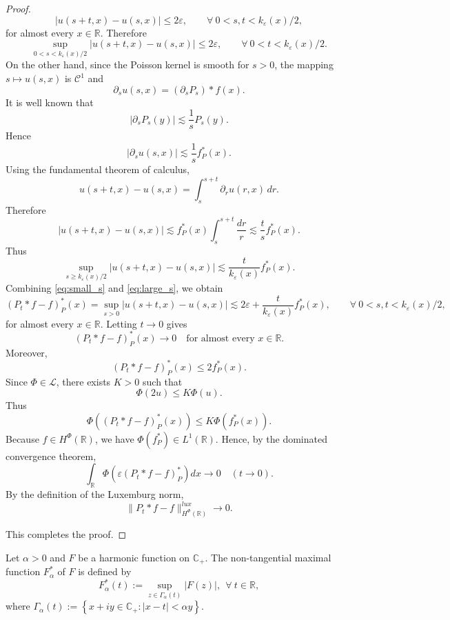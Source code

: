 \documentclass[a4paper,12pt,intlimits,oneside]{amsart}
\theoremstyle{definition}
\numberwithin{equation}{section}
\theoremstyle{definition}
\begin{document}
\begin{proof}
\[
|u(s+t,x)-u(s,x)|
\le
2\varepsilon,
\qquad \forall~ 0<s,t<k_{\varepsilon}(x)/2,
\]
for almost every $x\in\mathbb R$. Therefore
\begin{equation}\label{eq:small_s}
\sup_{0<s<k_\varepsilon(x)/2}
|u(s+t,x)-u(s,x)|
\le
2\varepsilon,
\qquad \forall~ 0<t<k_\varepsilon(x)/2 .
\end{equation}
On the other hand, since the Poisson kernel is smooth for $s>0$, the mapping
$s\mapsto u(s,x)$ is $\mathscr C^1$ and
\[
\partial_s u(s,x)
=
(\partial_s P_s)*f(x).
\]
It is well known that
\[
|\partial_s P_s(y)|
\lesssim
\frac1s P_s(y).
\]
Hence
\[
|\partial_s u(s,x)|
\lesssim
\frac1s f_P^*(x).
\]
Using the fundamental theorem of calculus,
\[
u(s+t,x)-u(s,x)
=
\int_s^{s+t}\partial_r u(r,x)\,dr.
\]
Therefore
\[
|u(s+t,x)-u(s,x)|
\lesssim
f_P^*(x)\int_s^{s+t}\frac{dr}{r}
\lesssim
\frac{t}{s}f_P^*(x).
\]
Thus
\begin{equation}\label{eq:large_s}
\sup_{s\ge k_\varepsilon(x)/2}
|u(s+t,x)-u(s,x)|
\lesssim
\frac{t}{k_\varepsilon(x)}f_P^*(x).
\end{equation}
Combining \eqref{eq:small_s} and \eqref{eq:large_s}, we obtain
\[
(P_t*f-f)_P^*(x)
=
\sup_{s>0}|u(s+t,x)-u(s,x)|
\lesssim
2\varepsilon
+
\frac{t}{k_\varepsilon(x)}f_P^*(x), 
\qquad \forall~ 0<s,t<k_{\varepsilon}(x)/2,
\]
for almost every $x\in\mathbb R$. Letting $t\to 0$ gives
\[
(P_t*f-f)_P^*(x)\longrightarrow0
\quad \text{for almost every } x\in\mathbb R .
\]
Moreover,
\[
(P_t*f-f)_P^*(x)
\le
2f_P^*(x).
\]
Since $\Phi\in\mathscr L$, there exists $K>0$ such that
\[
\Phi(2u)\le K\Phi(u).
\]
Thus
\[
\Phi((P_t*f-f)_P^*(x))
\le
K\Phi(f_P^*(x)).
\]
Because $f\in H^\Phi(\mathbb R)$, we have
$\Phi(f_P^*)\in L^1(\mathbb R)$.
Hence, by the dominated convergence theorem,
\[
\int_{\mathbb R}
\Phi\!\left(\varepsilon (P_t*f-f)_P^*\right)dx
\longrightarrow0
\quad (t\to0).
\]
By the definition of the Luxemburg norm,
\[
\|P_t*f-f\|_{H^\Phi(\mathbb R)}^{lux}
\longrightarrow0 .
\]

This completes the proof.
\end{proof}


\medskip


\noindent

Let $\alpha>0$ and $F$ be a harmonic function on $\mathbb{C_{+}}$. The  non-tangential  maximal  function  $F_{\alpha}^{*}$ of  $F$ is defined by 
 $$   F_{\alpha}^{*}(t):=\sup_{z\in \Gamma_{\alpha}(t)}|F(z)|, ~~\forall~ t \in \mathbb{R},  $$
 where  $ \Gamma_{\alpha}(t) := \left\{ x+iy \in \mathbb{C_{+}}: | x-t | < \alpha y  \right\}$. 
\end{document}
